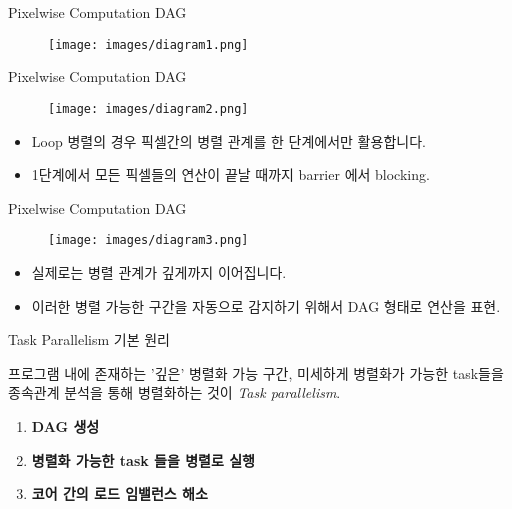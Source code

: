 \documentclass{bredelebeamer}
\begin{document}

\begin{frame}[fragile]{Pixelwise Computation DAG}
  \begin{figure}
    \texttt{[image: images/diagram1.png]}
  \end{figure}
\end{frame}

\begin{frame}[fragile]{Pixelwise Computation DAG}
  \begin{figure}
    \texttt{[image: images/diagram2.png]}
  \end{figure}
  \begin{itemize}
    \item Loop 병렬의 경우 픽셀간의 병렬 관계를 한 단계에서만 활용합니다.
    \item 1단계에서 모든 픽셀들의 연산이 끝날 때까지 barrier 에서 blocking.
  \end{itemize}
\end{frame}

\begin{frame}[fragile]{Pixelwise Computation DAG}
  \begin{figure}
    \texttt{[image: images/diagram3.png]}
  \end{figure}
  \begin{itemize}
    \item 실제로는 병렬 관계가 깊게까지 이어집니다.
    \item 이러한 병렬 가능한 구간을 자동으로 감지하기 위해서 DAG 형태로 연산을 표현.
  \end{itemize}
\end{frame}

\begin{frame}[fragile]{Task Parallelism 기본 원리}
  \begin{center}
  프로그램 내에 존재하는 '깊은' 병렬화 가능 구간, 미세하게 병렬화가 가능한 task들을 종속관계 분석을 통해 병렬화하는 것이 \textit{Task parallelism}.
  \end{center}

  \begin{enumerate}
    \item \textbf{DAG 생성}
      \bigskip
    \item \textbf{병렬화 가능한 task 들을 병렬로 실행}
      \bigskip
    \item \textbf{코어 간의 로드 임밸런스 해소}
      \bigskip
  \end{enumerate}
\end{frame}
\end{document}
